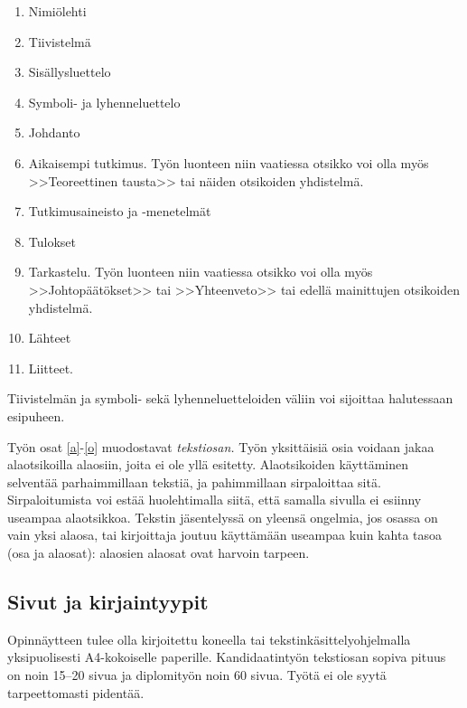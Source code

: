 \documentclass[english,12pt,a4paper,pdftex,sci,utf8]{aaltothesis}
\begin{document}
\begin{enumerate}
\item Nimi\"olehti
\item Tiivistelm\"a
\item Sis\"allysluettelo
\item Symboli- ja lyhenneluettelo
\item \label{a} Johdanto
\item  Aikaisempi tutkimus. Ty\"on luonteen niin vaatiessa otsikko voi olla my\"os
        >>Teoreettinen tausta>>  tai n\"aiden otsikoiden yhdistelm\"a.
\item Tutkimusaineisto ja -menetelm\"at %
\item Tulokset
\item \label{o} Tarkastelu. Ty\"on luonteen niin vaatiessa otsikko voi
      olla my\"os >>Johtop\"a\"at\"okset>> tai >>Yhteenveto>>
      tai edell\"a mainittujen otsikoiden yhdistelm\"a.
\item L\"ahteet
\item Liitteet.
\end{enumerate}

Tiivistelm\"an ja symboli- sek\"a lyhenneluetteloiden
v\"aliin voi sijoittaa halutessaan esipuheen.

Ty\"on osat \ref{a}-\ref{o} muodostavat \textit{tekstiosan.}  Ty\"on
yksitt\"aisi\"a osia voidaan jakaa alaotsikoilla alaosiin, joita ei ole
yll\"a esitetty. Alaotsikoiden k\"aytt\"aminen selvent\"a\"a parhaimmillaan
teksti\"a, ja pahimmillaan sirpaloittaa sit\"a.  Sirpaloitumista voi est\"a\"a
huolehtimalla siit\"a, ett\"a samalla sivulla ei esiinny useampaa
alaotsikkoa.  Tekstin j\"asentelyss\"a on yleens\"a ongelmia, jos osassa on
vain yksi alaosa, tai kirjoittaja joutuu k\"aytt\"am\"a\"an useampaa kuin
kahta tasoa (osa ja alaosat): alaosien alaosat ovat harvoin tarpeen.
\subsection*{Sivut ja kirjaintyypit}

Opinn\"aytteen tulee olla kirjoitettu koneella tai
tekstink\"asittelyohjelmalla yksipuolisesti A4-kokoiselle paperille.
Kandidaatinty\"on tekstiosan sopiva pituus on noin 15--20 sivua ja
diplomity\"on noin 60 sivua. Ty\"ot\"a ei ole syyt\"a tarpeettomasti pident\"a\"a.
\end{document}
